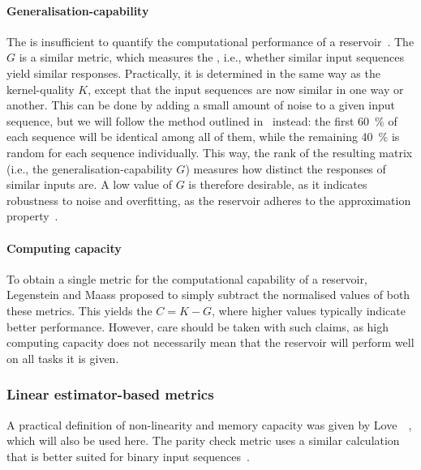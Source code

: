 \paragraph{Generalisation-capability}
The  is insufficient to quantify the computational performance of a reservoir~\cite{WhatMakesPowerful,RC_ASI,IL_Masterproef}.
The  $G$ is a similar metric, which measures the , i.e., whether similar input sequences yield similar responses.
Practically, it is determined in the same way as the kernel-quality $K$, except that the input sequences are now similar in one way or another.
This can be done by adding a small amount of noise to a given input sequence, but we will follow the method outlined in~\cite{RC_ASI} instead: the first \SI{60}{\percent} of each sequence will be identical among all of them, while the remaining \SI{40}{\percent} is random for each sequence individually.
This way, the rank of the resulting matrix (i.e., the generalisation-capability $G$) measures how distinct the responses of similar inputs are.
A low value of $G$ is therefore desirable, as it indicates robustness to noise and overfitting, as the reservoir adheres to the approximation property~\cite{RCbenchmarksReview1}.

\paragraph{Computing capacity}
To obtain a single metric for the computational capability of a reservoir, Legenstein and Maass proposed to simply subtract the normalised values of both these metrics.
This yields the  $C = K - G$, where higher values typically indicate better performance.
However, care should be taken with such claims, as high computing capacity does not necessarily mean that the reservoir will perform well on all tasks it is given.

\subsubsection{Linear estimator-based metrics}
A practical definition of non-linearity and memory capacity was given by Love~\etal~\cite{RC_TaskAgnosticMetrics_v2}, which will also be used here.
The parity check metric uses a similar calculation that is better suited for binary input sequences~\cite{hon2021numerical,tsunegi2019STOforcedsyncRC}.

